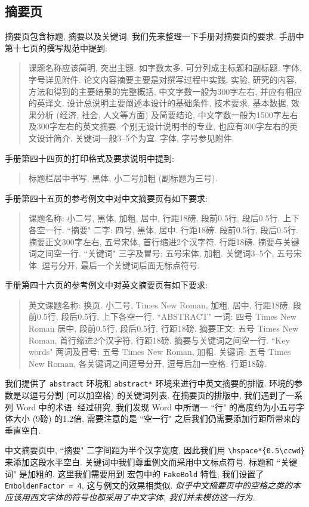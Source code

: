 \subsection{摘要页}

摘要页包含标题, 摘要以及关键词. 我们先来整理一下手册对摘要页的要求. 手册中第十七页的撰写规范中提到:
\begin{quote}
  课题名称应该简明, 突出主题. 如字数太多, 可分列成主标题和副标题. 字体, 字号详见附件.
  论文内容摘要主要是对撰写过程中实践, 实验, 研究的内容, 方法和得到的主要结果的完整概括, 中文字数一般为300字左右, 并应有相应的英译文.
  设计总说明主要阐述本设计的基础条件, 技术要求, 基本数据, 效果分析 (经济, 社会, 人文等方面) 及简要结论, 中文字数一般为1500字左右及300字左右的英文摘要. 个别无设计说明书的专业, 也应有300字左右的英文设计简介.
  关键词一般3--5个为宜. 字体, 字号参见附件.
\end{quote}
手册第四十四页的打印格式及要求说明中提到:
\begin{quote}
  标题栏居中书写, 黑体, 小二号加粗 (副标题为三号).
\end{quote}
手册第四十五页的参考例文中对中文摘要页有如下要求:
\begin{quote}
  课题名称: 小二号, 黑体, 加粗, 居中, 行距18磅, 段前0.5行, 段后0.5行. 上下各空一行.
  ``摘要" 二字: 四号, 黑体, 居中. 行距18磅. 段前0.5行, 段后0.5行.
  摘要正文300字左右, 五号宋体, 首行缩进2个汉字符. 行距18磅.
  摘要与关键词之间空一行.
  ``关键词" 三字及冒号: 五号宋体, 加粗.
  关键词3--5个, 五号宋体. 逗号分开, 最后一个关键词后面无标点符号.
\end{quote}
手册第四十六页的参考例文中对英文摘要页有如下要求:
\begin{quote}
  英文课题名称: 换页. 小二号, Times New Roman, 加粗, 居中, 行距18磅, 段前0.5行, 段后0.5行, 上下各空一行.
  ``ABSTRACT" 一词: 四号 Times New Roman 居中, 段前0.5行, 段后0.5行. 行距18磅.
  摘要正文: 五号 Times New Roman, 首行缩进2个汉字符, 行距18磅.
  摘要与关键词之间空一行.
  ``Key words" 两词及冒号: 五号 Times New Roman, 加粗.
  关键词: 五号 Times New Roman, 各关键词之间逗号分开, 逗号后加一空格. 行距18磅.
\end{quote}

我们提供了 \verb|abstract| 环境和 \verb|abstract*| 环境来进行中英文摘要的排版. 环境的参数是以逗号分割 (可以加空格) 的关键词列表. 在摘要页的排版中, 我们遇到了一系列 Word 中的术语. 经过研究, 我们发现 Word 中所谓一 ``行" 的高度约为小五号字体大小 (9磅) 的1.2倍, 需要注意的是 ``空一行" 之后我们仍需要添加行距所带来的垂直空白.

中文摘要页中, ``摘要" 二字间距为半个汉字宽度, 因此我们用 \verb|\hspace*{0.5\ccwd}| 来添加这段水平空白. 关键词中我们尊重例文而采用中文标点符号. 标题和 ``关键词" 是加粗的, 这里我们需要用到  宏包中的 \verb|FakeBold| 特性, 我们设置了 \verb|EmboldenFactor = 4|, 这与例文的效果相类似. \emph{似乎中文摘要页中的空格之类的本应该用西文字体的符号也都采用了中文字体, 我们并未模仿这一行为.}

